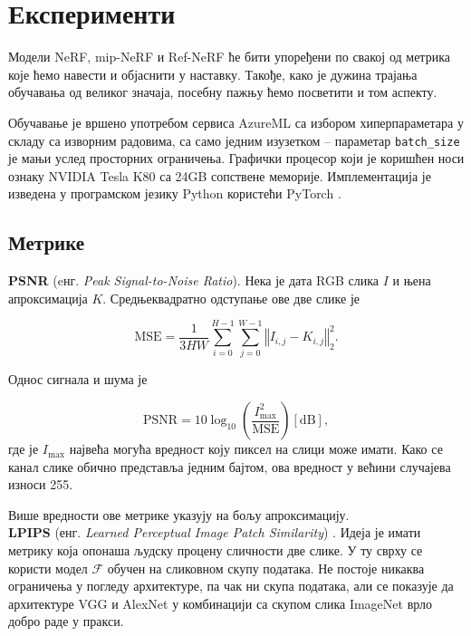 \documentclass[12pt, a4paper, twoside]{book}
\numberwithin{equation}{chapter}
\numberwithin{theorem}{section}
\numberwithin{definition}{section}
\numberwithin{definitionChapter}{chapter}
\begin{document}
\chapter{Експерименти}
Модели NeRF, mip-NeRF и Ref-NeRF ће бити упоређени по свакој од метрика које ћемо навести и објаснити у наставку. Такође, како је дужина
трајања обучавања од великог значаја, посебну пажњу ћемо посветити и том аспекту.

Обучавање је вршено употребом сервиса AzureML са избором хиперпараметара у складу са изворним радовима, са само једним
изузетком -- параметар \texttt{batch\_size} је мањи услед просторних ограничења. Графички процесор који је коришћен
носи ознаку NVIDIA Tesla K80 са 24GB сопствене меморије. Имплементација је изведена у програмском језику Python
користећи PyTorch \cite{pytorch}.

\section{Метрике}
\noindent \textbf{PSNR} (eнг. \textit{Peak Signal-to-Noise Ratio}). Нека је дата RGB слика $I$ и њена
апроксимација $K$. Средњеквадратно одступање ове две слике је

\begin{equation}
	\text{MSE} = \frac{1}{3HW} \sum_{i=0}^{H-1}\sum_{j=0}^{W-1} \left\Vert I_{i, j} - K_{i, j} \right\Vert_2^2.
\end{equation}

Однос сигнала и шума је

\begin{equation}
	\text{PSNR} = 10\log_{10}\left(\frac{I_{\max}^2}{\text{MSE}}\right) \left[\text{dB}\right],
\end{equation}
где је $I_{\max}$ највећа могућа вредност коју пиксел на слици може имати. Како се канал слике обично
представља једним бајтом, ова вредност у већини случајева износи 255.

Више вредности ове метрике указују на бољу апроксимацију. \\

\noindent \textbf{LPIPS} (енг. \textit{Learned Perceptual Image Patch Similarity}) \cite{lpips}. Идеја је имати метрику
која опонаша људску процену сличности две слике. У ту сврху се користи модел $\mathcal{F}$ обучен на сликовном
скупу података. Не постоје никаква ограничења у погледу архитектуре, па чак ни скупа података, али се показује да архитектуре
VGG \cite{vgg} и AlexNet \cite{alexnet} у комбинацији са скупом слика ImageNet врло добро раде у пракси.
\end{document}

